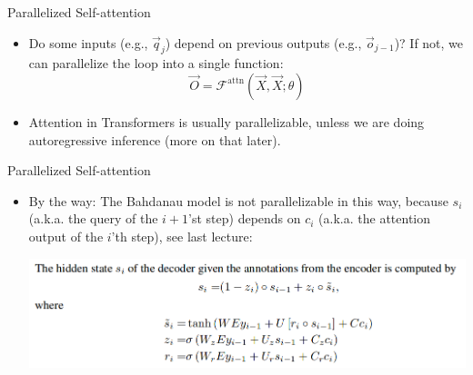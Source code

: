 
\begin{vbframe}{Parallelized Self-attention}

\vfill

\begin{itemize}
\item Do some inputs (e.g., $\vec q_j$) depend on previous outputs (e.g., $\vec o_{j-1}$)? If not, we can parallelize the loop into a single function:
$$\vec O = \mathcal{F}^\mathrm{attn}(\vec X, \vec X; \theta)$$
\item Attention in Transformers is usually parallelizable, unless we are doing autoregressive inference (more on that later).
\end{itemize}

\vfill

\end{vbframe}


\begin{vbframe}{Parallelized Self-attention}

\vfill

\begin{itemize}
\item By the way: The Bahdanau model is not parallelizable in this way, because $s_i$ (a.k.a. the query of the $i+1$'st step) depends on $c_i$ (a.k.a. the attention output of the $i$'th step), see last lecture:
\begin{center}
\includegraphics[width=.9\textwidth]{figure/bahdanau3}
\end{center}
\end{itemize}

\vfill

\end{vbframe}


